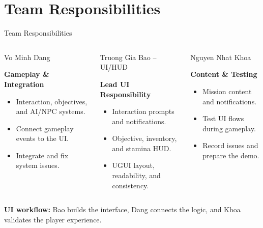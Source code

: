 \documentclass[aspectratio=169,10pt]{beamer}
\begin{document}
\section{Team Responsibilities}
\begin{frame}{Team Responsibilities}
  \begin{columns}[T,onlytextwidth]
    \begin{block}{Vo Minh Dang}
      \begin{minipage}[t][.35\textheight][t]{\linewidth}
        \small
        \textbf{Gameplay \& Integration}
        \begin{itemize}
          \item Interaction, objectives, and AI/NPC systems.
          \item Connect gameplay events to the UI.
          \item Integrate and fix system issues.
        \end{itemize}
      \end{minipage}
    \end{block}

    \begin{alertblock}{Truong Gia Bao -- UI/HUD}
      \begin{minipage}[t][.35\textheight][t]{\linewidth}
        \small
        \textbf{Lead UI Responsibility}
        \begin{itemize}
          \item Interaction prompts and notifications.
          \item Objective, inventory, and stamina HUD.
          \item UGUI layout, readability, and consistency.
        \end{itemize}
      \end{minipage}
    \end{alertblock}

    \begin{block}{Nguyen Nhat Khoa}
      \begin{minipage}[t][.35\textheight][t]{\linewidth}
        \small
        \textbf{Content \& Testing}
        \begin{itemize}
          \item Mission content and notifications.
          \item Test UI flows during gameplay.
          \item Record issues and prepare the demo.
        \end{itemize}
      \end{minipage}
    \end{block}
  \end{columns}

  \vspace{0.15cm}
  \small\centering
  \textbf{UI workflow:} Bao builds the interface, Dang connects the logic, and Khoa validates the player experience.
\end{frame}
\end{document}
